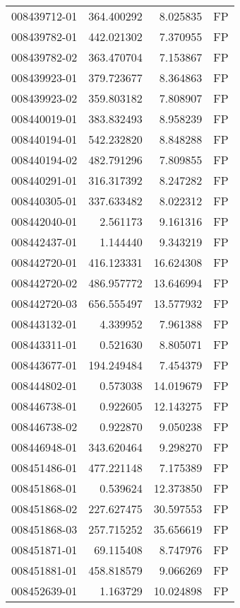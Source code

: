 \begin{tabular}{lrrl}
008439712-01 &  364.400292 &     8.025835 &   FP \\
008439782-01 &  442.021302 &     7.370955 &   FP \\
008439782-02 &  363.470704 &     7.153867 &   FP \\
008439923-01 &  379.723677 &     8.364863 &   FP \\
008439923-02 &  359.803182 &     7.808907 &   FP \\
008440019-01 &  383.832493 &     8.958239 &   FP \\
008440194-01 &  542.232820 &     8.848288 &   FP \\
008440194-02 &  482.791296 &     7.809855 &   FP \\
008440291-01 &  316.317392 &     8.247282 &   FP \\
008440305-01 &  337.633482 &     8.022312 &   FP \\
008442040-01 &    2.561173 &     9.161316 &   FP \\
008442437-01 &    1.144440 &     9.343219 &   FP \\
008442720-01 &  416.123331 &    16.624308 &   FP \\
008442720-02 &  486.957772 &    13.646994 &   FP \\
008442720-03 &  656.555497 &    13.577932 &   FP \\
008443132-01 &    4.339952 &     7.961388 &   FP \\
008443311-01 &    0.521630 &     8.805071 &   FP \\
008443677-01 &  194.249484 &     7.454379 &   FP \\
008444802-01 &    0.573038 &    14.019679 &   FP \\
008446738-01 &    0.922605 &    12.143275 &   FP \\
008446738-02 &    0.922870 &     9.050238 &   FP \\
008446948-01 &  343.620464 &     9.298270 &   FP \\
008451486-01 &  477.221148 &     7.175389 &   FP \\
008451868-01 &    0.539624 &    12.373850 &   FP \\
008451868-02 &  227.627475 &    30.597553 &   FP \\
008451868-03 &  257.715252 &    35.656619 &   FP \\
008451871-01 &   69.115408 &     8.747976 &   FP \\
008451881-01 &  458.818579 &     9.066269 &   FP \\
008452639-01 &    1.163729 &    10.024898 &   FP \\

\end{tabular}

